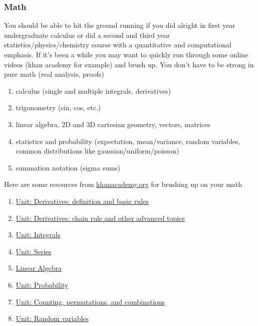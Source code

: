 \documentclass[11pt, oneside]{article}   	%
\begin{document}
\subsubsection{Math}
You should be able to hit the ground running if you did alright in first year undergraduate calculus or did a second and third year statistics/physics/chemistry course with a quantitative and computational emphasis. If it's been a while you may want to quickly run through some online videos (khan academy for example) and brush up. You don't have to be strong in pure math (real analysis, proofs)
\begin{enumerate}
	\item calculus (single and multiple integrals, derivatives)
	\item trigonometry (sin, cos, etc.)
	\item linear algebra, 2D and 3D cartesian geometry, vectors, matrices
	\item statistics and probability (expectation, mean/variance, random variables, common distributions like gaussian/uniform/poisson)
	\item summation notation (sigma sums)
\end{enumerate}

Here are some resources from \url{khanacademy.org} for brushing up on your math

\begin{enumerate}
	\item \href{https://www.khanacademy.org/math/differential-calculus/dc-diff-intro}{Unit: Derivatives: definition and basic rules} 
	\item \href{https://www.khanacademy.org/math/differential-calculus/dc-chain}{Unit: Derivatives: chain rule and other advanced topics}
	\item \href{https://www.khanacademy.org/math/integral-calculus/ic-integration} {Unit: Integrals}
	\item \href{https://www.khanacademy.org/math/integral-calculus/ic-series}{Unit: Series}
	\item \href{https://www.khanacademy.org/math/linear-algebra}{Linear Algebra}
	\item \href{https://www.khanacademy.org/math/statistics-probability/probability-library}{Unit: Probability}
	\item \href{https://www.khanacademy.org/math/statistics-probability/counting-permutations-and-combinations}{Unit: Counting, permutations, and combinations}
	\item \href{https://www.khanacademy.org/math/statistics-probability/random-variables-stats-library}{Unit: Random variables}
\end{enumerate}
\end{document}
